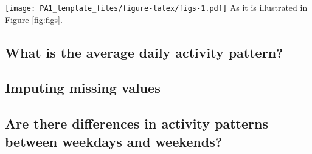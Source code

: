 \documentclass[]{article}
\newenvironment{Shaded}{\begin{snugshade}}{\end{snugshade}}
\newcommand{\KeywordTok}[1]{\textcolor[rgb]{0.13,0.29,0.53}{\textbf{#1}}}
\newcommand{\DataTypeTok}[1]{\textcolor[rgb]{0.13,0.29,0.53}{#1}}
\newcommand{\StringTok}[1]{\textcolor[rgb]{0.31,0.60,0.02}{#1}}
\newcommand{\OperatorTok}[1]{\textcolor[rgb]{0.81,0.36,0.00}{\textbf{#1}}}
\newcommand{\NormalTok}[1]{#1}
\begin{document}
\begin{Shaded}
\end{Shaded}

\texttt{[image: PA1\_template\_files/figure-latex/figs-1.pdf]} As it is
illustrated in Figure \ref{fig:figs}.

\subsection{What is the average daily activity
pattern?}\label{what-is-the-average-daily-activity-pattern}

\subsection{Imputing missing values}\label{imputing-missing-values}

\subsection{Are there differences in activity patterns between weekdays
and
weekends?}\label{are-there-differences-in-activity-patterns-between-weekdays-and-weekends}
\end{document}
